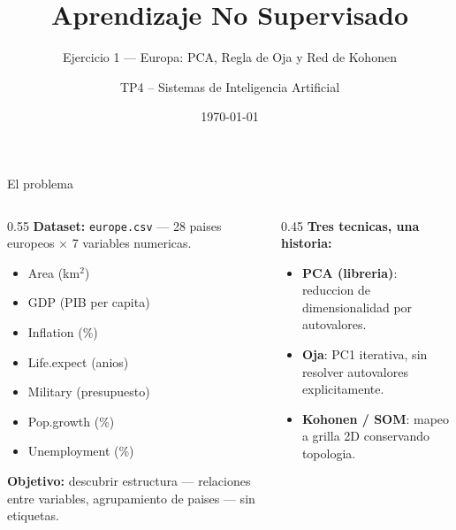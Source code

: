 \documentclass[aspectratio=169, 10pt]{beamer}
\title{Aprendizaje No Supervisado}
\subtitle{Ejercicio 1 --- Europa: PCA, Regla de Oja y Red de Kohonen}
\author{TP4 -- Sistemas de Inteligencia Artificial}
\institute{ITBA --- 2026}
\date{\today}
\begin{document}
\maketitle


\begin{frame}{El problema}
  \begin{columns}[T]
    \begin{column}{0.55\textwidth}
      \textbf{Dataset:} \texttt{europe.csv} --- 28 paises europeos $\times$ 7 variables numericas.
      \vspace{0.3em}
      \begin{itemize}
        \item Area (km$^2$)
        \item GDP (PIB per capita)
        \item Inflation (\%)
        \item Life.expect (anios)
        \item Military (presupuesto)
        \item Pop.growth (\%)
        \item Unemployment (\%)
      \end{itemize}
      \vspace{0.5em}
      \textbf{Objetivo:} descubrir estructura --- relaciones entre variables, agrupamiento de paises --- \alert{sin etiquetas}.
    \end{column}
    \begin{column}{0.45\textwidth}
      \textbf{Tres tecnicas, una historia:}
      \begin{itemize}
        \item \textbf{PCA (libreria)}: reduccion de dimensionalidad por autovalores.
        \item \textbf{Oja}: PC1 iterativa, sin resolver autovalores explicitamente.
        \item \textbf{Kohonen / SOM}: mapeo a grilla 2D conservando topologia.
      \end{itemize}
    \end{column}
  \end{columns}
\end{frame}
\end{document}
